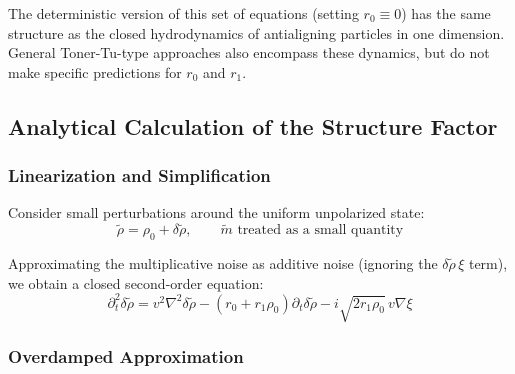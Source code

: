 \begin{remark}
The deterministic version of this set of equations (setting $r_0 \equiv 0$) has the same structure as the closed hydrodynamics of antialigning particles\cite{boltz2025} in one dimension. General Toner-Tu-type approaches\cite{toner1998} also encompass these dynamics, but do not make specific predictions for $r_0$ and $r_1$.
\end{remark}

\subsection{Analytical Calculation of the Structure Factor}\label{subsec:structure-factor}

\subsubsection{Linearization and Simplification}

Consider small perturbations around the uniform unpolarized state:
\begin{equation}\label{eq:linearization}
\tilde{\rho} = \rho_0 + \delta\tilde{\rho}, \qquad \tilde{m} \text{ treated as a small quantity}
\end{equation}

Approximating the multiplicative noise as additive noise (ignoring the $\delta\tilde{\rho}\,\xi$ term), we obtain a closed second-order equation:
\begin{equation}\label{eq:second-order-eq}
\partial_t^2 \delta\tilde{\rho} = v^2\nabla^2\delta\tilde{\rho} - (r_0 + r_1\rho_0)\partial_t\delta\tilde{\rho} - i\sqrt{2r_1\rho_0}\,v\nabla\xi
\end{equation}

\subsubsection{Overdamped Approximation}

